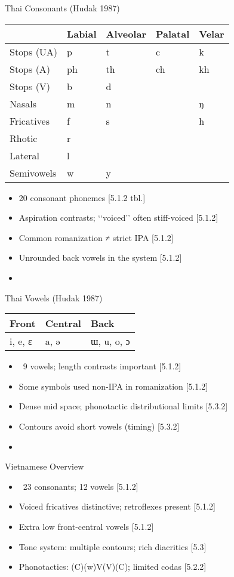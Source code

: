 \documentclass{beamer}
\newcommand{\booksrc}[1]{\hfill {\tiny [#1]}}
\begin{document}
\begin{frame}{Thai Consonants (Hudak 1987)}
\begin{tabular}{lllll}
 & Labial & Alveolar & Palatal & Velar \\
\hline
Stops (UA) & p & t & c & k \\
Stops (A) & ph & th & ch & kh \\
Stops (V) & b & d &  &  \\
Nasals & m & n &  & ŋ \\
Fricatives & f & s &  & h \\
Rhotic & r &  &  &  \\
Lateral & l &  &  &  \\
Semivowels & w & y &  &  \\
\end{tabular}
\begin{itemize}
\item 20 consonant phonemes \booksrc{5.1.2 tbl.}
\item Aspiration contrasts; ‘‘voiced’’ often stiff-voiced \booksrc{5.1.2}
\item Common romanization ≠ strict IPA \booksrc{5.1.2}
\item Unrounded back vowels in the system \booksrc{5.1.2}
\item %
\end{itemize}
\end{frame}

\begin{frame}{Thai Vowels (Hudak 1987)}
\begin{tabular}{lll}
Front & Central & Back \\
\hline
i, e, ɛ & a, ə & ɯ, u, o, ɔ \\
\end{tabular}
\begin{itemize}
\item ~9 vowels; length contrasts important \booksrc{5.1.2}
\item Some symbols used non-IPA in romanization \booksrc{5.1.2}
\item Dense mid space; phonotactic distributional limits \booksrc{5.3.2}
\item Contours avoid short vowels (timing) \booksrc{5.3.2}
\item %
\end{itemize}
\end{frame}

\begin{frame}{Vietnamese Overview}
\begin{itemize}
\item ~23 consonants; 12 vowels \booksrc{5.1.2}
\item Voiced fricatives distinctive; retroflexes present \booksrc{5.1.2}
\item Extra low front-central vowels \booksrc{5.1.2}
\item Tone system: multiple contours; rich diacritics \booksrc{5.3}
\item Phonotactics: (C)(w)V(V)(C); limited codas \booksrc{5.2.2}
\end{itemize}
\end{frame}
\end{document}
